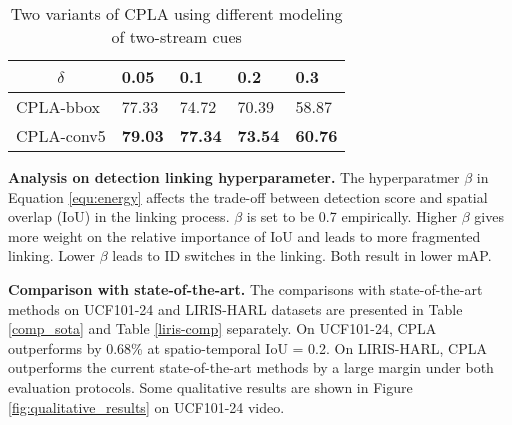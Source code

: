 \documentclass{bmvc2k}
\begin{document}
\begin{table}[!htbp]
\centering
\caption{Two variants of CPLA using different modeling of two-stream cues}
\label{fusion_perf}
\begin{tabular}{l|l|l|l|l}
\hline
\multicolumn{1}{c|}{$\delta$}                           & 0.05  & 0.1   & 0.2   & 0.3   \\ \hline
CPLA-bbox & 77.33 & 74.72 & 70.39 & 58.87 \\ \hline
CPLA-conv5 & \textbf{79.03} & \textbf{77.34} & \textbf{73.54} & \textbf{60.76} \\ \hline
\end{tabular}
\end{table}

\textbf{Analysis on detection linking hyperparameter.}
The hyperparatmer $\beta$ in Equation \ref{equ:energy} affects the trade-off between detection score and spatial overlap (IoU) in the linking process. $\beta$ is set to be 0.7 empirically. Higher $\beta$ gives more weight on the relative importance of IoU and leads to more fragmented linking. Lower $\beta$ leads to ID switches in the linking. Both result in lower mAP.






\textbf{Comparison with state-of-the-art.} The comparisons with state-of-the-art methods on UCF101-24 and LIRIS-HARL datasets are presented in Table \ref{comp_sota} and Table \ref{liris-comp} separately. On UCF101-24, CPLA
outperforms \cite{peng2016multi} by 0.68\% at spatio-temporal IoU = 0.2. On LIRIS-HARL,  CPLA outperforms the current state-of-the-art methods by a large margin under both evaluation protocols. Some qualitative results are shown in Figure \ref{fig:qualitative_results} on UCF101-24 video.
\end{document}

